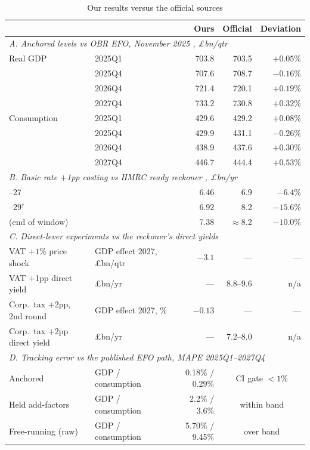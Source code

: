 \begin{table}[ht]
\centering
\caption{Our results versus the official sources}
\label{tab:comparison}
\small
\setlength{\tabcolsep}{3pt}
\begin{tabular}{llrrr}
\toprule
 & & Ours & Official & Deviation \\
\midrule
\multicolumn{5}{l}{\emph{A. Anchored levels vs OBR EFO, November 2025 \citep{obr2025efo}, \pounds bn/qtr}}\\
\quad Real GDP & 2025Q1 & 703.8 & 703.5 & $+0.05\%$ \\
\quad          & 2025Q4 & 707.6 & 708.7 & $-0.16\%$ \\
\quad          & 2026Q4 & 721.4 & 720.1 & $+0.19\%$ \\
\quad          & 2027Q4 & 733.2 & 730.8 & $+0.32\%$ \\
\quad Consumption & 2025Q1 & 429.6 & 429.2 & $+0.08\%$ \\
\quad             & 2025Q4 & 429.9 & 431.1 & $-0.26\%$ \\
\quad             & 2026Q4 & 438.9 & 437.6 & $+0.30\%$ \\
\quad             & 2027Q4 & 446.7 & 444.4 & $+0.53\%$ \\
\midrule
\multicolumn{5}{l}{\emph{B. Basic rate $+$1pp costing vs HMRC ready reckoner \citep{hmrc2025reckoner}, \pounds bn/yr}}\\
\quad 2026--27 & & 6.46 & 6.9 & $-6.4\%$ \\
\quad 2028--29$^{\dagger}$ & & 6.92 & 8.2 & $-15.6\%$ \\
\quad 2030 (end of window) & & 7.38 & $\approx$8.2 & $-10.0\%$ \\
\midrule
\multicolumn{5}{l}{\emph{C. Direct-lever experiments vs the reckoner's direct yields \citep{hmrc2025reckoner}}}\\
\quad VAT $+1\%$ price shock & GDP effect 2027, \pounds bn/qtr & $-3.1$ & --- & --- \\
\quad VAT $+$1pp direct yield & \pounds bn/yr & --- & 8.8--9.6 & n/a \\
\quad Corp.\ tax $+$2pp, 2nd round & GDP effect 2027, \% & $-0.13$ & --- & --- \\
\quad Corp.\ tax $+$2pp direct yield & \pounds bn/yr & --- & 7.2--8.0 & n/a \\
\midrule
\multicolumn{5}{l}{\emph{D. Tracking error vs the published EFO path, MAPE 2025Q1--2027Q4}}\\
\quad Anchored & GDP / consumption & 0.18\% / 0.29\% & \multicolumn{2}{c}{CI gate $<1\%$} \\
\quad Held add-factors & GDP / consumption & 2.2\% / 3.6\% & \multicolumn{2}{c}{within band} \\
\quad Free-running (raw) & GDP / consumption & 5.70\% / 9.45\% & \multicolumn{2}{c}{over band} \\
\bottomrule
\end{tabular}


\end{table}
